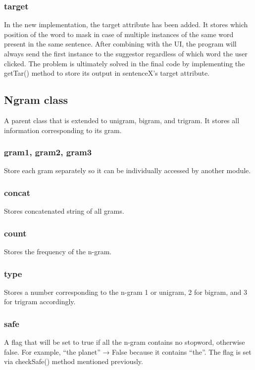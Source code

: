 \documentclass[12pt,oneside,openright,a4paper]{cpe-english-project}
\begin{document}
\subsubsection{ target}
In the new implementation, the target attribute has been added. It stores which position of the word to mask in case of multiple instances of the same word present in the same sentence. After combining with the UI, the program will always send the first instance to the suggestor regardless of which word the user clicked. The problem is ultimately solved in the final code by implementing the getTar() method to store its output in sentenceX’s target attribute.

\subsection{Ngram class}
A parent class that is extended to unigram, bigram, and trigram. It stores all information corresponding to its gram.

\subsubsection{gram1, gram2, gram3}
Store each gram separately so it can be individually accessed by another module.

\subsubsection{concat}
Stores concatenated string of all grams. 

\subsubsection{count}
Stores the frequency of the n-gram. 

\subsubsection{ type}
Stores a number corresponding to the n-gram 1 or unigram, 2 for bigram, and 3 for trigram accordingly. 

\subsubsection{ safe }
A flag that will be set to true if all the n-gram contains no stopword, otherwise false. For example, “the planet” → False because it contains “the”. The flag is set via checkSafe() method mentioned previously.
\end{document}
